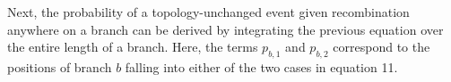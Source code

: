 \documentclass[11pt]{article}
\begin{document}


\noindent Next, the probability of a topology-unchanged event given recombination 
anywhere on a branch can be derived by integrating the previous equation 
over the entire length of a branch.
Here, the terms $p_{b,1}$ and $p_{b,2}$ correspond to the positions of branch 
$b$ falling into either of the two cases in equation 11.%

\end{document}
